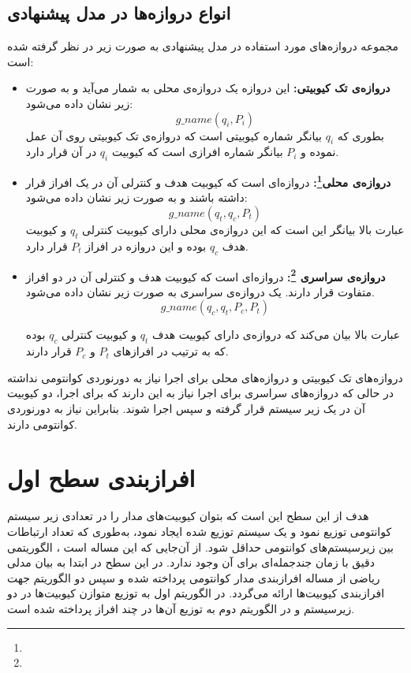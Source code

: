 \subsection{انواع دروازه‌ها در مدل پیشنهادی}
مجموعه دروازه‌های مورد استفاده در مدل پیشنهادی به صورت زیر در نظر گرفته شده است:
\begin{itemize}
\item
\textbf{دروازه‌ی تک کیوبیتی:}
این دروازه یک دروازه‌ی محلی به شمار می‌آید و به صورت زیر نشان داده می‌شود:
\begin{equation}
g\_name(q_{i},P_{i})
\label{eq23}
\end{equation}
بطوری که $q_{i}$ بیانگر شماره کیوبیتی است که دروازه‌ی تک کیوبیتی روی آن عمل نموده و $P_{i}$ بیانگر شماره افرازی است که کیوبیت $q_{i}$ در آن قرار دارد.

\item
\textbf{دروازه‌ی محلی\footnote{}: }
 دروازه‌ای است که کیوبیت هدف و کنترلی آن در یک افراز قرار داشته باشند و به صورت زیر نشان داده می‌شود:
\begin{equation}
g\_name(q_{t},q_{c},P_{t})
\label{eq24}
\end{equation}
عبارت بالا بیانگر این است که این دروازه‌ی محلی دارای کیوبیت کنترلی $q_{t}$ و کیوبیت هدف $q_{c}$ بوده و این دروازه در افراز $P_{t}$ قرار دارد. 

\item
\textbf{دروازه‌ی سراسری \footnote{}: }
دروازه‌ای است که کیوبیت هدف و کنترلی آن در دو افراز متفاوت قرار دارند. یک دروازه‌ی سراسری به صورت زیر نشان داده می‌شود.
\begin{equation}
g\_name(q_{c},q_{t},P_{c},P_{t})
\label{eq25}
\end{equation}

عبارت بالا بیان می‌کند که دروازه‌ی  دارای کیوبیت هدف $q_{t}$ و کیوبیت کنترلی $q_{c}$ بوده که به ترتیب در افراز‌های $P_{t}$ و $P_{c}$ قرار دارند.
\end{itemize}
دروازه‌های تک کیوبیتی و دروازه‌های محلی برای اجرا نیاز به دورنوردی کوانتومی نداشته در حالی که دروازه‌های سراسری برای اجرا نیاز به این دارند که برای اجرا، دو کیوبیت آن در یک زیر سیستم قرار گرفته و سپس اجرا شوند. بنابراین نیاز به دورنوردی کوانتومی دارند.
\section{افرازبندی سطح اول}
هدف از این سطح این است که بتوان کیوبیت‌های مدار را در تعدادی زیر سیستم کوانتومی توزیع نمود و یک سیستم توزیع شده ایجاد نمود، به‌طوری‌ که تعداد ارتباطات بین زیرسیستم‌های کوانتومی حداقل شود. از آن‌جایی که این مساله  است \cite{andreevvv}، الگوریتمی دقیق با زمان جندجمله‌ای برای آن وجود ندارد. در این سطح در ابتدا به بیان مدلی ریاضی از مساله افرازبندی مدار کوانتومی پرداخته شده و سپس دو الگوریتم جهت افراز‌بندی کیوبیت‌ها ارائه می‌‌گردد. در الگوریتم اول به توزیع متوازن کیوبیت‌ها در دو زیرسیستم و در الگوریتم دوم به توزیع آن‌ها در چند افراز پرداخته شده است. 
